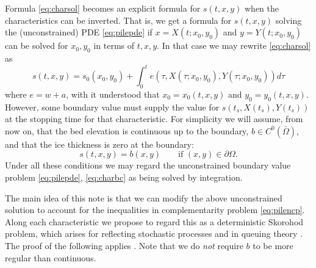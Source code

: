 \documentclass[hidelinks,onefignum,onetabnum,final]{siamart220329}  %
\begin{document}
Formula \eqref{eq:charsol} becomes an explicit formula for $s(t,x,y)$ when the characteristics can be inverted.  That is, we get a formula for $s(t,x,y)$ solving the (unconstrained) PDE \eqref{eq:pilepde} if $x=X(t;x_0,y_0)$ and $y=Y(t;x_0,y_0)$ can be solved for $x_0,y_0$ in terms of $t,x,y$.  In that case we may rewrite \eqref{eq:charsol} as
\begin{equation}
s(t,x,y) = s_0(x_0,y_0)
  + \int_0^t e\!\left(\tau, X(\tau;x_0,y_0), Y(\tau;x_0,y_0)\right) d\tau \label{eq:charsolagain}
\end{equation}
where $e=w+a$, with it understood that $x_0=x_0(t,x,y)$ and $y_0=y_0(t,x,y)$.  However, some boundary value must supply the value for $s(t_s,X(t_s),Y(t_s))$ at the stopping time for that characteristic.  For simplicity we will assume, from now on, that the bed elevation is continuous up to the boundary, $b \in C^0(\bar\Omega)$, and that the ice thickness is zero at the boundary:
\begin{equation}
s(t,x,y) = b(x,y) \qquad \text{if } (x,y)\in\partial\Omega.  \label{eq:charbc}
\end{equation}
Under all these conditions we may regard the unconstrained boundary value problem \eqref{eq:pilepde}, \eqref{eq:charbc} as being solved by integration.

The main idea of this note is that we can modify the above unconstrained solution to account for the inequalities in complementarity problem \eqref{eq:pilencp}.  Along each characteristic we propose to regard this as a deterministic Skorohod problem, which arises for reflecting stochastic processes \cite{LionsSznitman1984} and in queuing theory \cite[section 1.4.1]{Stewart2011}.  The proof of the following applies \cite[Lemma 6.14]{KaratzasShreve1991}.  Note that we do \emph{not} require $b$ to be more regular than continuous.
\end{document}
